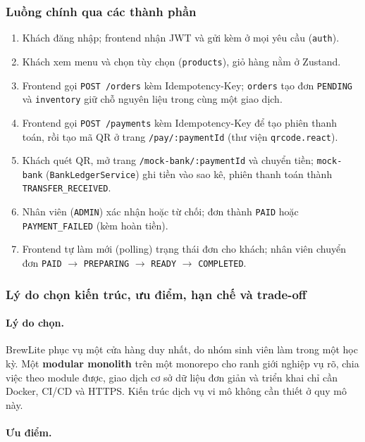 \subsubsection{Luồng chính qua các thành phần}

\begin{enumerate}
  \item Khách đăng nhập; frontend nhận JWT và gửi kèm ở mọi yêu cầu (\texttt{auth}).
  \item Khách xem menu và chọn tùy chọn (\texttt{products}), giỏ hàng nằm ở Zustand.
  \item Frontend gọi \texttt{POST /orders} kèm Idempotency-Key; \texttt{orders} tạo đơn \texttt{PENDING} và \texttt{inventory} giữ chỗ nguyên liệu trong cùng một giao dịch.
  \item Frontend gọi \texttt{POST /payments} kèm Idempotency-Key để tạo phiên thanh toán, rồi tạo mã QR ở trang \texttt{/pay/:paymentId} (thư viện \texttt{qrcode.react}).
  \item Khách quét QR, mở trang \texttt{/mock-bank/:paymentId} và chuyển tiền; \texttt{mock-bank} (\texttt{BankLedgerService}) ghi tiền vào sao kê, phiên thanh toán thành \texttt{TRANSFER\_RECEIVED}.
  \item Nhân viên (\texttt{ADMIN}) xác nhận hoặc từ chối; đơn thành \texttt{PAID} hoặc \texttt{PAYMENT\_FAILED} (kèm hoàn tiền).
  \item Frontend tự làm mới (polling) trạng thái đơn cho khách; nhân viên chuyển đơn \texttt{PAID} $\rightarrow$ \texttt{PREPARING} $\rightarrow$ \texttt{READY} $\rightarrow$ \texttt{COMPLETED}.
\end{enumerate}

\subsubsection{Lý do chọn kiến trúc, ưu điểm, hạn chế và trade-off}

\paragraph{Lý do chọn.}

BrewLite phục vụ một cửa hàng duy nhất, do nhóm sinh viên làm trong một học kỳ. Một \textbf{modular monolith} trên một monorepo cho ranh giới nghiệp vụ rõ, chia việc theo module được, giao dịch cơ sở dữ liệu đơn giản và triển khai chỉ cần Docker, CI/CD và HTTPS. Kiến trúc dịch vụ vi mô không cần thiết ở quy mô này.

\paragraph{Ưu điểm.}

